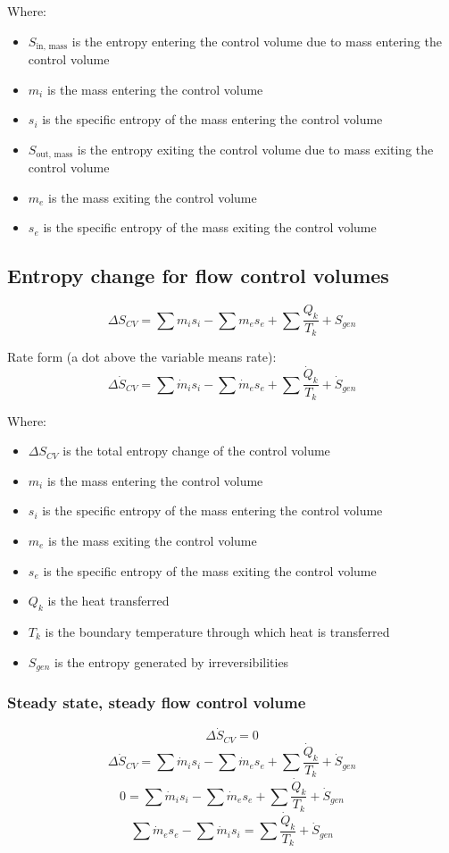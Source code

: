 \documentclass[11pt]{article}
\begin{document}
Where:
\begin{itemize}
\item \(S_{\text{in, mass}}\) is the entropy entering the control volume due to mass entering the control volume
\item \(m_i\) is the mass entering the control volume
\item \(s_i\) is the specific entropy of the mass entering the control volume
\item \(S_{\text{out, mass}}\) is the entropy exiting the control volume due to mass exiting the control volume
\item \(m_e\) is the mass exiting the control volume
\item \(s_e\) is the specific entropy of the mass exiting the control volume
\end{itemize}

\subsection{Entropy change for flow control volumes}
\label{sec:org8dcfbd1}
\[\Delta S_{CV} = \sum m_i s_i - \sum m_e s_e + \sum \frac{Q_k}{T_k} + S_{gen}\]

Rate form (a dot above the variable means rate):
\[\Delta \dot{S}_{CV} = \sum \dot{m}_i s_i - \sum \dot{m}_e s_e + \sum \frac{\dot{Q}_k}{T_k} + \dot{S}_{gen}\]

Where:
\begin{itemize}
\item \(\Delta S_{CV}\) is the total entropy change of the control volume
\item \(m_i\) is the mass entering the control volume
\item \(s_i\) is the specific entropy of the mass entering the control volume
\item \(m_e\) is the mass exiting the control volume
\item \(s_e\) is the specific entropy of the mass exiting the control volume
\item \(Q_k\) is the heat transferred
\item \(T_k\) is the boundary temperature through which heat is transferred
\item \(S_{gen}\) is the entropy generated by irreversibilities
\end{itemize}

\subsubsection{Steady state, steady flow control volume}
\label{sec:orgddd2262}
\[\Delta \dot{S}_{CV} = 0\]
\[\Delta \dot{S}_{CV} = \sum \dot{m}_i s_i - \sum \dot{m}_e s_e + \sum \frac{\dot{Q}_k}{T_k} + \dot{S}_{gen}\]
\[0 = \sum \dot{m}_i s_i - \sum \dot{m}_e s_e + \sum \frac{\dot{Q}_k}{T_k} + \dot{S}_{gen}\]
\[\sum \dot{m}_e s_e - \sum \dot{m}_i s_i = \sum \frac{\dot{Q}_k}{T_k} + \dot{S}_{gen}\]
\end{document}
